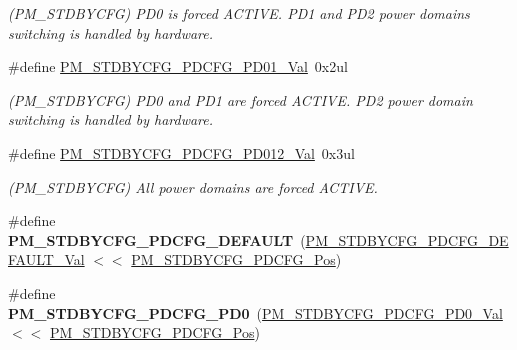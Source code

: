 \begin{DoxyCompactItemize}
\begin{DoxyCompactList}\small\item\em (P\+M\+\_\+\+S\+T\+D\+B\+Y\+C\+F\+G) P\+D0 is forced A\+C\+T\+I\+V\+E. P\+D1 and P\+D2 power domains switching is handled by hardware. \end{DoxyCompactList}\item 
\hypertarget{group___s_a_m_l21___p_m_ga7db06b2806877e425348a3fdc87b5a14}{}\#define \hyperlink{group___s_a_m_l21___p_m_ga7db06b2806877e425348a3fdc87b5a14}{P\+M\+\_\+\+S\+T\+D\+B\+Y\+C\+F\+G\+\_\+\+P\+D\+C\+F\+G\+\_\+\+P\+D01\+\_\+\+Val}~0x2ul\label{group___s_a_m_l21___p_m_ga7db06b2806877e425348a3fdc87b5a14}

\begin{DoxyCompactList}\small\item\em (P\+M\+\_\+\+S\+T\+D\+B\+Y\+C\+F\+G) P\+D0 and P\+D1 are forced A\+C\+T\+I\+V\+E. P\+D2 power domain switching is handled by hardware. \end{DoxyCompactList}\item 
\hypertarget{group___s_a_m_l21___p_m_ga29382ddddd347cbbc9511caa1376ef09}{}\#define \hyperlink{group___s_a_m_l21___p_m_ga29382ddddd347cbbc9511caa1376ef09}{P\+M\+\_\+\+S\+T\+D\+B\+Y\+C\+F\+G\+\_\+\+P\+D\+C\+F\+G\+\_\+\+P\+D012\+\_\+\+Val}~0x3ul\label{group___s_a_m_l21___p_m_ga29382ddddd347cbbc9511caa1376ef09}

\begin{DoxyCompactList}\small\item\em (P\+M\+\_\+\+S\+T\+D\+B\+Y\+C\+F\+G) All power domains are forced A\+C\+T\+I\+V\+E. \end{DoxyCompactList}\item 
\hypertarget{group___s_a_m_l21___p_m_gae1251f4b7240a1424abb02a291af4cee}{}\#define {\bfseries P\+M\+\_\+\+S\+T\+D\+B\+Y\+C\+F\+G\+\_\+\+P\+D\+C\+F\+G\+\_\+\+D\+E\+F\+A\+U\+L\+T}~(\hyperlink{group___s_a_m_l21___p_m_ga3c9a1696d9f36483a6ab4bc45b3b6116}{P\+M\+\_\+\+S\+T\+D\+B\+Y\+C\+F\+G\+\_\+\+P\+D\+C\+F\+G\+\_\+\+D\+E\+F\+A\+U\+L\+T\+\_\+\+Val} $<$$<$ \hyperlink{group___s_a_m_l21___p_m_ga19332dcd50a38dcde23771afb543cfef}{P\+M\+\_\+\+S\+T\+D\+B\+Y\+C\+F\+G\+\_\+\+P\+D\+C\+F\+G\+\_\+\+Pos})\label{group___s_a_m_l21___p_m_gae1251f4b7240a1424abb02a291af4cee}

\item 
\hypertarget{group___s_a_m_l21___p_m_ga9a7042480d0a283bdf9d508bf223db88}{}\#define {\bfseries P\+M\+\_\+\+S\+T\+D\+B\+Y\+C\+F\+G\+\_\+\+P\+D\+C\+F\+G\+\_\+\+P\+D0}~(\hyperlink{group___s_a_m_l21___p_m_ga39fd06a76e6132ad14ff533d0f3b4398}{P\+M\+\_\+\+S\+T\+D\+B\+Y\+C\+F\+G\+\_\+\+P\+D\+C\+F\+G\+\_\+\+P\+D0\+\_\+\+Val}     $<$$<$ \hyperlink{group___s_a_m_l21___p_m_ga19332dcd50a38dcde23771afb543cfef}{P\+M\+\_\+\+S\+T\+D\+B\+Y\+C\+F\+G\+\_\+\+P\+D\+C\+F\+G\+\_\+\+Pos})\label{group___s_a_m_l21___p_m_ga9a7042480d0a283bdf9d508bf223db88}


\end{DoxyCompactItemize}
